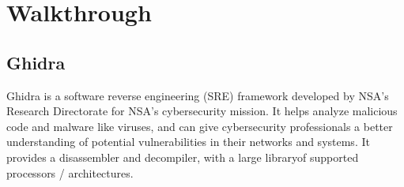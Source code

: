 \documentclass{article}
\begin{document}
\pagebreak
\section{Walkthrough}

\subsection{Ghidra}

Ghidra is a software reverse engineering (SRE) framework developed by NSA's Research Directorate for NSA's 
cybersecurity mission. It helps analyze malicious code and malware like viruses, and can give cybersecurity 
professionals a better understanding of potential vulnerabilities in their networks and systems. It provides 
a disassembler and decompiler, with a large libraryof supported processors / architectures.
\end{document}
